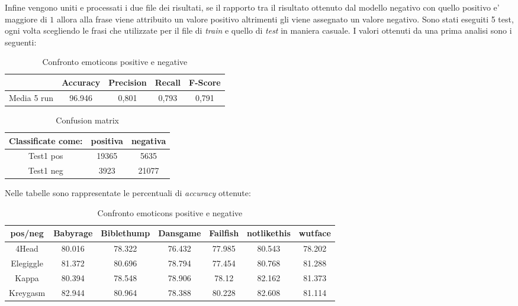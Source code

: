 \documentclass[a4paper,12pt,openright,twoside]{report}
\theoremstyle{definition}
\begin{document}
Infine vengono uniti e processati i due file dei risultati, se il rapporto tra il risultato ottenuto
dal modello negativo con quello positivo e' maggiore di $1$ allora alla frase viene attribuito
un valore positivo altrimenti gli viene assegnato un valore negativo.
Sono stati eseguiti 5 test, ogni volta scegliendo le frasi che utilizzate per il file di \emph{train} e 
quello di \emph{test} in maniera casuale. I valori ottenuti da una prima analisi sono i seguenti:
\begin{table}[H]
\begin{center}
\begin{tabular}{|c|c|c|c|c|}
\hline
 & Accuracy & Precision & Recall & F-Score\\
\hline
Media 5 run & 96.946 &  0,801 & 0,793 & 0,791 \\
\hline
\end{tabular}
\end{center}
\caption{Confronto emoticons positive e negative}
\label{tab:rposNeg}
\end{table}

\begin{table}[H]
\begin{center}
\begin{tabular}{|c|c|c|}
\hline
 Classificate come: & positiva & negativa \\
\hline
Test1 pos & 19365 & 5635 \\
\hline
Test1 neg & 3923 & 21077 \\
\hline
\end{tabular}
\end{center}
\caption{Confusion matrix}
\label{tab:confusion}
\end{table}
\iffalse
Nelle tabelle sono rappresentate le percentuali di \emph{accuracy} ottenute:
\begin{table}[H]
\begin{center}
\begin{tabular}{|c|c|c|c|c|c|c|}
\hline
\textbf{pos/neg} & Babyrage & Biblethump & Dansgame & Failfish & notlikethis & wutface \\
\hline
4Head & 80.016 &  78.322 & 76.432 & 77.985 & 80.543 & 78.202 \\
\hline
Elegiggle & 81.372 & 80.696 & 78.794 & 77.454 & 80.768 & 81.288 \\
\hline
Kappa & 80.394 & 78.548 & 78.906 & 78.12 & 82.162 & 81.373 \\
\hline
Kreygasm & 82.944 & 80.964 & 78.388 & 80.228 & 82.608 & 81.114 \\
\hline
\end{tabular}
\end{center}
\caption{Confronto emoticons positive e negative}
\label{tab:rnnlmTest1}
\end{table}
\end{document}
